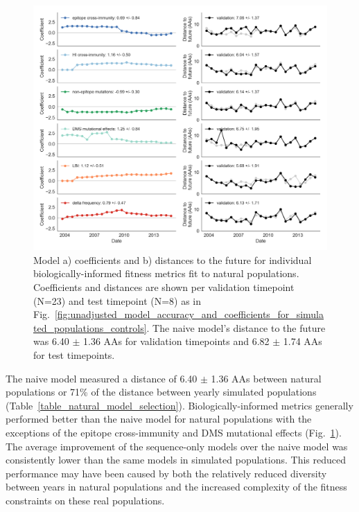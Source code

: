 \begin{figure}[ht]
  \begin{center}
  \includegraphics[width=\textwidth]{figures/unadjusted-model-accuracy-and-coefficients-for-natural-populations.png}
  \caption{
    Model a) coefficients and b) distances to the future for individual biologically-informed fitness metrics fit to natural populations.
    Coefficients and distances are shown per validation timepoint (N=23) and test timepoint (N=8) as in Fig.~\ref{fig:unadjusted_model_accuracy_and_coefficients_for_simulated_populations_controls}.
    The naive model's distance to the future was 6.40 $\pm$ 1.36 AAs for validation timepoints and 6.82 $\pm$ 1.74 AAs for test timepoints.
  }
  \label{fig:unadjusted_model_accuracy_and_coefficients_for_natural_populations}
  \end{center}
\end{figure}

The naive model measured a distance of 6.40 $\pm$ 1.36 AAs between natural populations or 71\% of the distance between yearly simulated populations (Table~\ref{table_natural_model_selection}).
Biologically-informed metrics generally performed better than the naive model for natural populations with the exceptions of the epitope cross-immunity and DMS mutational effects (Fig.~\ref{fig:unadjusted_model_accuracy_and_coefficients_for_natural_populations}).
The average improvement of the sequence-only models over the naive model was consistently lower than the same models in simulated populations.
This reduced performance may have been caused by both the relatively reduced diversity between years in natural populations and the increased complexity of the fitness constraints on these real populations.

